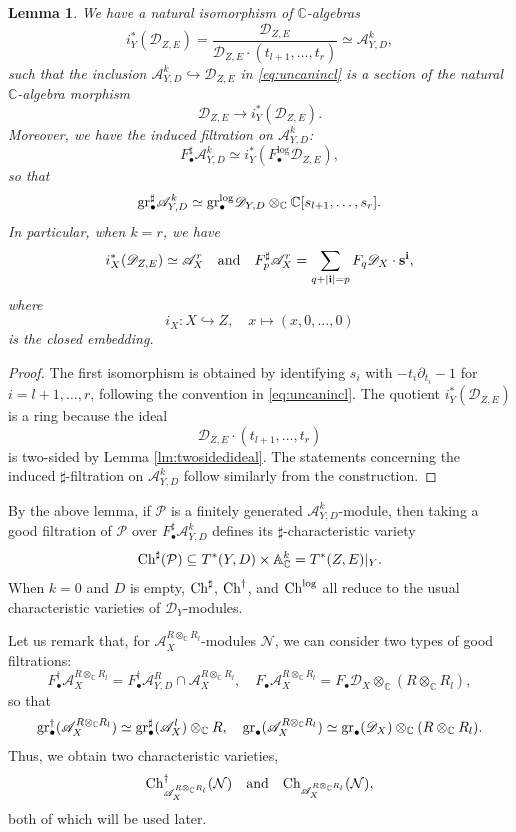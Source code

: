 \documentclass{amsart}
\theoremstyle{plain}
\numberwithin{theorem}{section}
\newtheorem{lemma}[theorem]{Lemma}
\theoremstyle{definition}
\theoremstyle{remark}
\theoremstyle{definition}
\newcommand{\A}{\mathbb{A}}
\newcommand{\C}{\mathbb{C}} %
\newcommand{\cN}{\mathcal{N}}
\newcommand{\cP}{\mathcal{P}}
\newcommand{\gr}{\textup{gr}}
\newcommand{\sA}{\mathscr{A}}
\newcommand{\shD}{\mathscr{D}}
\newcommand{\Ch}{\textup{Ch}}
\begin{document}
\begin{lemma}\label{lm:logsp}
We have a natural isomorphism of $\C$-algebras
\[
i_Y^*(\shD_{Z,E})
=
\frac{\shD_{Z,E}}{\shD_{Z,E}\cdot(t_{l+1},\dots,t_r)}
\simeq
\sA^k_{Y,D},
\]
such that the inclusion $\sA^k_{Y,D}\hookrightarrow \shD_{Z,E}$ in \eqref{eq:uncanincl} is a section of the natural $\C$-algebra morphism
\[
\shD_{Z,E}\longrightarrow i_Y^*(\shD_{Z,E}).
\]
Moreover, we have the induced filtration on $\sA^k_{Y,D}$:
\[
F^\sharp_\bullet\sA^k_{Y,D}
\simeq
i_Y^*(F^{\log}_\bullet\shD_{Z,E}),
\]
so that
\[
\gr^\sharp_\bullet\sA^k_{Y,D}
\simeq
\gr^{\log}_\bullet\shD_{Y,D}\otimes_\C \C[s_{l+1},\dots,s_r].
\]
In particular, when $k=r$, we have
\[
i_X^*(\shD_{Z,E})\simeq \sA_X^r
\quad \textup{and} \quad
F^\sharp_p\sA_X^r
=
\sum_{q+|\mathbf{i}|=p}F_q\shD_X\cdot \mathbf{s}^{\mathbf{i}},
\]
where
\[
i_X\colon X\hookrightarrow Z,\quad x\mapsto (x,0,\dots,0)
\]
is the closed embedding.
\end{lemma}

\begin{proof}
The first isomorphism is obtained by identifying $s_i$ with
$-t_i\partial_{t_i}-1$ for $i=l+1,\dots,r$, following the convention in \eqref{eq:uncanincl}. The quotient $i_Y^*(\shD_{Z,E})$ is a ring because the ideal
\[
\shD_{Z,E}\cdot(t_{l+1},\dots,t_r)
\]
is two-sided by Lemma \ref{lm:twosidedideal}. The statements concerning the induced $\sharp$-filtration on $\sA^k_{Y,D}$ follow similarly from the construction.
\end{proof}

By the above lemma, if $\cP$ is a finitely generated $\sA^k_{Y,D}$-module, then taking a good filtration of $\cP$ over $F^\sharp_\bullet\sA^k_{Y,D}$ defines its $\sharp$-characteristic variety
\[
\Ch^\sharp(\cP)
\subseteq
T^*(Y,D)\times \A_\C^k
=
T^*(Z,E)|_Y.
\]
When $k=0$ and $D$ is empty, $\Ch^\sharp$, $\Ch^\dagger$, and $\Ch^{\log}$ all reduce to the usual characteristic varieties of $\shD_Y$-modules.

Let us remark that, for $\sA_X^{R\otimes_\C R_l}$-modules $\cN$, we can consider two types of good filtrations:
\[
F^\dagger_\bullet \sA_X^{R\otimes_\C R_l}
=
F^\dagger_\bullet\sA^R_{Y,D}\cap \sA_X^{R\otimes_\C R_l},
\quad
F_\bullet \sA_X^{R\otimes_\C R_l}
=
F_\bullet\shD_X\otimes_\C (R\otimes_\C R_l),
\]
so that
\[
\gr^\dagger_\bullet(\sA_X^{R\otimes_\C R_l})
\simeq
\gr^\sharp_\bullet(\sA_X^l)\otimes_\C R,
\quad
\gr_\bullet(\sA_X^{R\otimes_\C R_l})
\simeq
\gr_\bullet(\shD_X)\otimes_\C (R\otimes_\C R_l).
\]
Thus, we obtain two characteristic varieties,
\[
\Ch^\dagger_{\sA_X^{R\otimes_\C R_l}}(\cN)
\quad \textup{and} \quad
\Ch_{\sA_X^{R\otimes_\C R_l}}(\cN),
\]
both of which will be used later.
\end{document}
